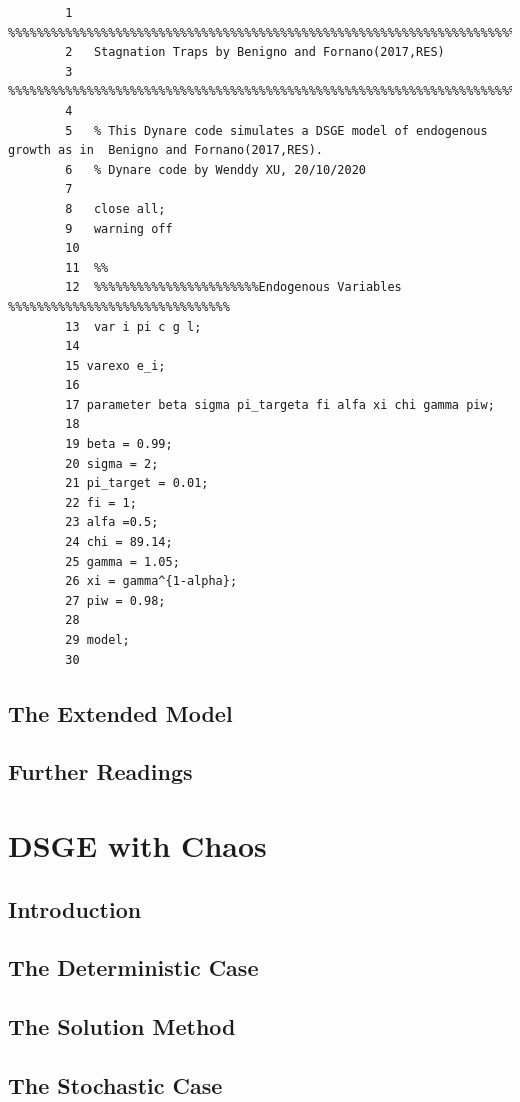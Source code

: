 \documentclass[cn,10pt,math=newtx,citestyle=gb7714-2015,bibstyle=gb7714-2015]{elegantbook}
\begin{document}
{{	\begin{lstlisting}
		1	%%%%%%%%%%%%%%%%%%%%%%%%%%%%%%%%%%%%%%%%%%%%%%%%%%%%%%%%%%%%%%%%%%%%%%%%%%%
		2	Stagnation Traps by Benigno and Fornano(2017,RES)
		3	%%%%%%%%%%%%%%%%%%%%%%%%%%%%%%%%%%%%%%%%%%%%%%%%%%%%%%%%%%%%%%%%%%%%%%%%%%%
		4	
		5	% This Dynare code simulates a DSGE model of endogenous growth as in  Benigno and Fornano(2017,RES).
		6	% Dynare code by Wenddy XU, 20/10/2020
		7	
		8	close all;
		9	warning off
		10	
		11	%%
		12	%%%%%%%%%%%%%%%%%%%%%%%Endogenous Variables %%%%%%%%%%%%%%%%%%%%%%%%%%%%%%%
		13	var i pi c g l;
		14
		15 varexo e_i;
		16
		17 parameter beta sigma pi_targeta fi alfa xi chi gamma piw;
		18
		19 beta = 0.99;
		20 sigma = 2;
		21 pi_target = 0.01;
		22 fi = 1;
		23 alfa =0.5;
		24 chi = 89.14;
		25 gamma = 1.05;
		26 xi = gamma^{1-alpha};
		27 piw = 0.98;
		28
		29 model;
		30  
	\end{lstlisting}
	
	
	\section{The Extended Model}
	
	
	
	
	
	\section{Further Readings}
	
    
    
    
    \chapter{DSGE with Chaos}	
	
	\section{Introduction}
	
	\section{The Deterministic Case}
	
	
	\section{The Solution Method}
	
	
	
	\section{The Stochastic Case}
	
}}
\end{document}
